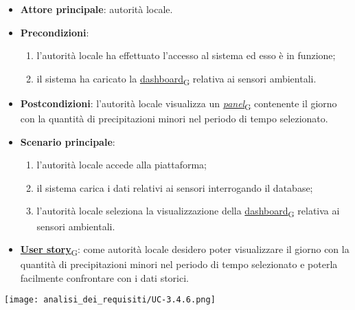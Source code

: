 \begin{itemize}
	\item \textbf{Attore principale}: autorità locale.
	\item \textbf{Precondizioni}:
	      \begin{enumerate}
		      \item l'autorità locale ha effettuato l'accesso al sistema ed esso è in funzione;
		      \item il sistema ha caricato la \href{https://7last.github.io/docs/pb/documentazione-interna/glossario\#dashboard}{dashboard\textsubscript{G}} relativa ai sensori ambientali.
	      \end{enumerate}
	\item \textbf{Postcondizioni}: l'autorità locale visualizza un \href{https://7last.github.io/docs/pb/documentazione-interna/glossario\#panel}{\textit{panel}\textsubscript{G}} contenente il giorno con la quantità di precipitazioni minori nel periodo di tempo selezionato.
	\item \textbf{Scenario principale}:
	      \begin{enumerate}
		      \item l'autorità locale accede alla piattaforma;
		      \item il sistema carica i dati relativi ai sensori interrogando il database;
		      \item l'autorità locale seleziona la visualizzazione della \href{https://7last.github.io/docs/pb/documentazione-interna/glossario\#dashboard}{dashboard\textsubscript{G}} relativa ai sensori ambientali.
	      \end{enumerate}
	\item \href{https://7last.github.io/docs/pb/documentazione-interna/glossario\#user-story}{\textbf{User story}\textsubscript{G}}:
	      come autorità locale desidero poter visualizzare il giorno con la quantità di precipitazioni minori nel periodo di tempo selezionato
	      e poterla facilmente confrontare con i dati storici.
\end{itemize}
\begin{center}
	\texttt{[image: analisi\_dei\_requisiti/UC-3.4.6.png]}
\end{center}


